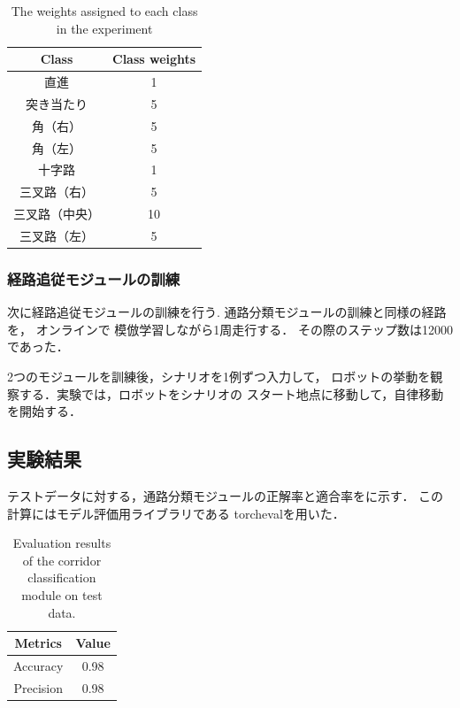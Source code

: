 \begin{table}[htbp]
    \centering
    \caption{The weights assigned to each class in the experiment}\label{tab:cost}
    \begin{tabular}{c|c}
    \hline
    Class & Class weights         \\
    \hline
    直進   & 1\\
    突き当たり   & 5\\
    角（右） & 5\\
    角（左）& 5 \\
    十字路 & 1  \\
    三叉路（右）& 5  \\
    三叉路（中央）& 10  \\
    三叉路（左） & 5  \\
    \hline
    \end{tabular}
\end{table}
\subsubsection{経路追従モジュールの訓練}
次に経路追従モジュールの訓練を行う.
通路分類モジュールの訓練と同様の経路を，
オンラインで 模倣学習しながら1周走行する．
その際のステップ数は12000であった．

2つのモジュールを訓練後，シナリオを1例ずつ入力して，
ロボットの挙動を観察する．実験では，ロボットをシナリオの
スタート地点に移動して，自律移動を開始する．

\vspace{5zh}



\newpage
\subsection{実験結果}
テストデータに対する，通路分類モジュールの正解率と適合率をに示す．
この計算にはモデル評価用ライブラリである
torcheval\cite{torcheval}を用いた．
\begin{table}[htbp]
    \centering
    \caption{Evaluation results of the corridor classification module on test data.}
    \label{tab:result}
    \begin{tabular}{c|c}
    \hline
    Metrics & Value       \\
    \hline
    Accuracy   & 0.98 \\
    Precision   & 0.98 \\
    \hline
    \end{tabular}
\end{table}

